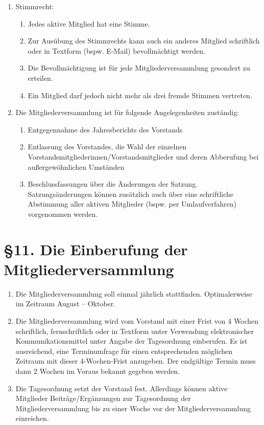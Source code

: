 \documentclass[a4paper,12pt]{article}
\begin{document}
\begin{enumerate}
	\item
		Stimmrecht:
		\begin{enumerate}[label=(\roman*)]
        		\item
				Jedes aktive Mitglied hat eine Stimme.
        		\item
				Zur Ausübung des Stimmrechts kann auch ein
				anderes Mitglied schriftlich oder in Textform
				(bspw. E-Mail) bevollmächtigt werden.
        		\item
				Die Bevollmächtigung ist für jede
				Mitgliederversammlung gesondert zu erteilen.
        		\item
				Ein Mitglied darf jedoch nicht mehr als drei
				fremde Stimmen vertreten.
    		\end{enumerate}
    	\item
		Die Mitgliederversammlung ist für folgende Angelegenheiten
		zuständig:
		\begin{enumerate}[label=(\roman*)]
			\item
				Entgegennahme des Jahresberichts des Vorstands
			\item
				Entlassung des Vorstandes, die Wahl der
				einzelnen
				Vorstandsmitgliederinnen/Vorstandsmitglieder
				und deren Abberufung bei außergewöhnlichen
				Umständen
			\item
				Beschlussfassungen über die Änderungen der
				Satzung. Satzungsänderungen können zusätzlich
				auch über eine schriftliche Abstimmung aller
				aktiven Mitglieder (bspw. per Umlaufverfahren)
				vorgenommen werden.
		\end{enumerate}
\end{enumerate}

\section*{§11. Die Einberufung der Mitgliederversammlung}

\begin{enumerate}
    	\item
		Die Mitgliederversammlung soll einmal jährlich stattfinden.
		Optimalerweise im Zeitraum August – Oktober.
    	\item
		Die Mitgliederversammlung wird vom Vorstand mit einer Frist von
		4 Wochen schriftlich, fernschriftlich oder in Textform unter
		Verwendung elektronischer Kommunikationsmittel unter Angabe der
		Tagesordnung einberufen. Es ist ausreichend, eine Terminumfrage
		für einen entsprechenden möglichen Zeitraum mit dieser
		4-Wochen-Frist anzugeben. Der endgültige Termin muss dann 2
		Wochen im Voraus bekannt gegeben werden.
    	\item
		Die Tagesordnung setzt der Vorstand fest. Allerdings können
		aktive Mitglieder Beiträge/Ergänzungen zur Tagesordnung der
		Mitgliederversammlung bis zu einer Woche vor der
		Mitgliederversammlung einreichen.
\end{enumerate}
\end{document}
